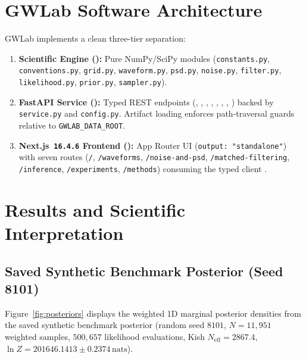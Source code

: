 \documentclass[11pt,a4paper]{report}
\begin{document}
\chapter{GWLab Software Architecture}

GWLab implements a clean three-tier separation:
\begin{enumerate}[leftmargin=1.5em]
    \item \textbf{Scientific Engine ():} Pure NumPy/SciPy modules (\texttt{constants.py}, \texttt{conventions.py}, \texttt{grid.py}, \texttt{waveform.py}, \texttt{psd.py}, \texttt{noise.py}, \texttt{filter.py}, \texttt{likelihood.py}, \texttt{prior.py}, \texttt{sampler.py}).
    \item \textbf{FastAPI Service ():} Typed REST endpoints (, , , , , , , ) backed by \texttt{service.py} and \texttt{config.py}. Artifact loading enforces path-traversal guards relative to \texttt{GWLAB\_DATA\_ROOT}.
    \item \textbf{Next.js~\texttt{16.4.6} Frontend ():} App Router UI (\texttt{output: "standalone"}) with seven routes (\texttt{/}, \texttt{/waveforms}, \texttt{/noise-and-psd}, \texttt{/matched-filtering}, \texttt{/inference}, \texttt{/experiments}, \texttt{/methods}) consuming the typed client .
\end{enumerate}

\chapter{Results and Scientific Interpretation}

\section{Saved Synthetic Benchmark Posterior (Seed 8101)}
Figure~\ref{fig:posteriors} displays the weighted 1D marginal posterior densities from the saved synthetic benchmark posterior (random seed $8101$, $N = 11{,}951$ weighted samples, $500{,}657$ likelihood evaluations, Kish $N_{\mathrm{eff}} = 2867.4$, $\ln Z = 201646.1413 \pm 0.2374\,\mathrm{nats}$).
\end{document}
